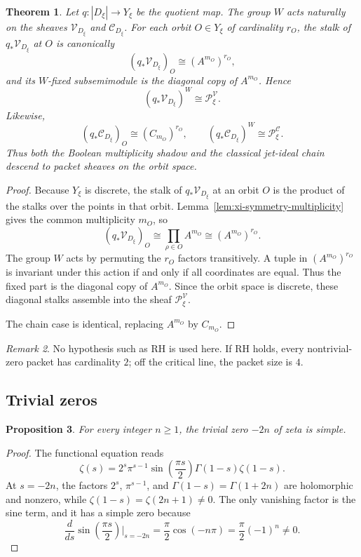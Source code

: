 \documentclass[11pt,a4paper]{article}
\numberwithin{equation}{section}
\newtheorem{theorem}{Theorem}[section]
\newtheorem{proposition}[theorem]{Proposition}
\theoremstyle{definition}
\theoremstyle{remark}
\newtheorem{remark}[theorem]{Remark}
\newcommand{\cV}{\mathcal V}
\newcommand{\cC}{\mathcal C}
\begin{document}
\begin{theorem}\label{thm:packet-descent}
Let $q:|D_\xi|\to Y_\xi$ be the quotient map.  The group $W$ acts naturally on the sheaves $\cV_{D_\xi}$ and $\cC_{D_\xi}$.  For each orbit $O\in Y_\xi$ of cardinality $r_O$, the stalk of $q_*\cV_{D_\xi}$ at $O$ is canonically
\[
(q_*\cV_{D_\xi})_O\cong (A^{m_O})^{r_O},
\]
and its $W$-fixed subsemimodule is the diagonal copy of $A^{m_O}$.  Hence
\[
(q_*\cV_{D_\xi})^W\cong \mathcal P_\xi^{\cV}.
\]
Likewise,
\[
(q_*\cC_{D_\xi})_O\cong (C_{m_O})^{r_O},
\qquad
(q_*\cC_{D_\xi})^W\cong \mathcal P_\xi^{\cC}.
\]
Thus both the Boolean multiplicity shadow and the classical jet-ideal chain descend to packet sheaves on the orbit space.
\end{theorem}

\begin{proof}
Because $Y_\xi$ is discrete, the stalk of $q_*\cV_{D_\xi}$ at an orbit $O$ is the product of the stalks over the points in that orbit.  Lemma~\ref{lem:xi-symmetry-multiplicity} gives the common multiplicity $m_O$, so
\[
(q_*\cV_{D_\xi})_O\cong \prod_{\rho\in O}A^{m_O}\cong (A^{m_O})^{r_O}.
\]
The group $W$ acts by permuting the $r_O$ factors transitively.  A tuple in $(A^{m_O})^{r_O}$ is invariant under this action if and only if all coordinates are equal.  Thus the fixed part is the diagonal copy of $A^{m_O}$.  Since the orbit space is discrete, these diagonal stalks assemble into the sheaf $\mathcal P_\xi^{\cV}$.

The chain case is identical, replacing $A^{m_O}$ by $C_{m_O}$.
\end{proof}

\begin{remark}
No hypothesis such as RH is used here.  If RH holds, every nontrivial-zero packet has cardinality $2$; off the critical line, the packet size is $4$.
\end{remark}

\subsection{Trivial zeros}

\begin{proposition}\label{prop:trivial-simple}
For every integer $n\ge1$, the trivial zero $-2n$ of zeta is simple.
\end{proposition}

\begin{proof}
The functional equation reads
\[
\zeta(s)=2^s\pi^{s-1}\sin\!\left(\frac{\pi s}{2}\right)\Gamma(1-s)\zeta(1-s).
\]
At $s=-2n$, the factors $2^s$, $\pi^{s-1}$, and $\Gamma(1-s)=\Gamma(1+2n)$ are holomorphic and nonzero, while $\zeta(1-s)=\zeta(2n+1)\neq0$.  The only vanishing factor is the sine term, and it has a simple zero because
\[
\frac{d}{ds}\sin\!\left(\frac{\pi s}{2}\right)\Big|_{s=-2n}=\frac\pi2\cos(-n\pi)=\frac\pi2(-1)^n\neq0.
\]
\end{proof}
\end{document}
